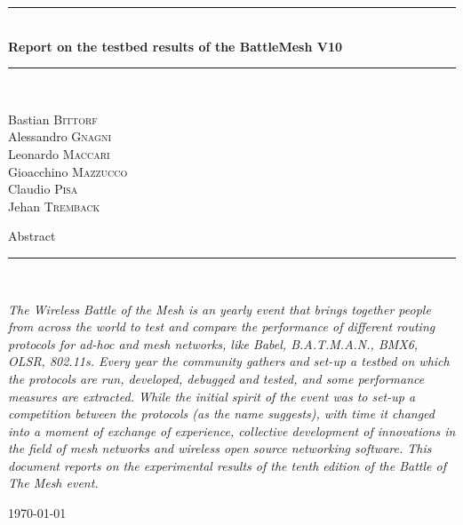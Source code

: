 \documentclass[10pt,onecolumn]{paper}
\newcommand{\HRule}{\rule{\linewidth}{0.5mm}}
\begin{document}
\begin{titlepage}
\begin{center}

\HRule \\[0.4cm]
{ \huge \bfseries Report on the testbed results of the BattleMesh V10 \\[0.4cm] }

\HRule \\[1.5cm]

\begin{minipage}{0.4\textwidth}
\begin{flushleft} \large
Bastian \textsc{Bittorf}\\
Alessandro \textsc{Gnagni}\\
Leonardo \textsc{Maccari}\\
Gioacchino \textsc{Mazzucco}\\
Claudio \textsc{Pisa}\\
Jehan \textsc{Tremback} \\
\end{flushleft}
\end{minipage}
\begin{minipage}{0.4\textwidth}
\end{minipage}

\vfill
{\large Abstract}
\HRule \\[0.4cm]
\begin{flushleft}
\emph{The Wireless Battle of the Mesh is an yearly event that brings together
people from across the world to test and compare the performance of different routing
protocols for ad-hoc and mesh networks, like Babel, B.A.T.M.A.N., BMX6, OLSR,
802.11s. Every year the community gathers and set-up a testbed on which the
protocols are run, developed, debugged and tested, and some performance
measures are extracted. While the initial spirit of the event was to set-up a
competition between the protocols (as the name suggests), with time it changed
into a moment of exchange of experience, collective development of
innovations in the field of mesh networks and wireless open source
networking software. This document reports on the experimental results of the tenth edition
of the Battle of The Mesh event.}
\end{flushleft}
\vskip2cm

\vfill

{\large \today}

\end{center}
\end{titlepage}
\end{document}
